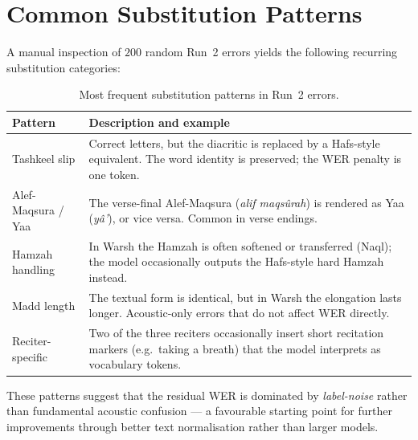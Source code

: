 \section{Common Substitution Patterns}

A manual inspection of $200$ random Run~2 errors yields the following
recurring substitution categories:

\begin{table}[H]
  \centering
  \caption{Most frequent substitution patterns in Run~2 errors.}
  \label{tab:mt_substitutions}
  \renewcommand{\arraystretch}{1.3}
  \begin{tabular}{lp{8.5cm}}
    \toprule
    \textbf{Pattern} & \textbf{Description and example} \\
    \midrule
    Tashkeel slip          & Correct letters, but the diacritic is replaced
                              by a Hafs-style equivalent. The word identity
                              is preserved; the WER penalty is one token. \\
    Alef-Maqsura / Yaa     & The verse-final Alef-Maqsura
                              (\textit{alif maqs{\^u}rah}) is rendered as
                              Yaa (\textit{y{\^a}'}), or vice versa.
                              Common in verse endings. \\
    Hamzah handling        & In Warsh the Hamzah is often softened or
                              transferred (Naql); the model occasionally
                              outputs the Hafs-style hard Hamzah instead. \\
    Madd length            & The textual form is identical, but in Warsh
                              the elongation lasts longer. Acoustic-only
                              errors that do not affect WER directly. \\
    Reciter-specific       & Two of the three reciters occasionally insert
                              short recitation markers (e.g.\ taking a
                              breath) that the model interprets as
                              vocabulary tokens. \\
    \bottomrule
  \end{tabular}
\end{table}

These patterns suggest that the residual WER is dominated by
\emph{label-noise} rather than fundamental acoustic confusion --- a
favourable starting point for further improvements through better
text normalisation rather than larger models.

